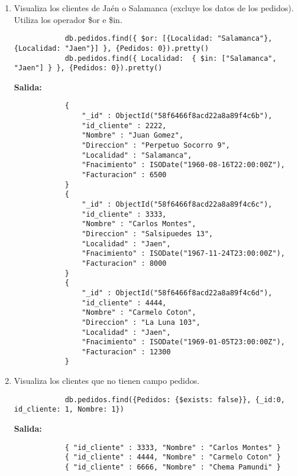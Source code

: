 \begin{enumerate}
	\item  Visualiza los clientes de Jaén o Salamanca (excluye los datos de los pedidos). Utiliza los operador \$or e \$in.
		\begin{lstlisting}
			db.pedidos.find({ $or: [{Localidad: "Salamanca"}, {Localidad: "Jaen"}] }, {Pedidos: 0}).pretty()
			db.pedidos.find({ Localidad:  { $in: ["Salamanca", "Jaen"] } }, {Pedidos: 0}).pretty()
		\end{lstlisting}
		\textbf{Salida:}
		\begin{lstlisting}
			{
				"_id" : ObjectId("58f6466f8acd22a8a89f4c6b"),
				"id_cliente" : 2222,
				"Nombre" : "Juan Gomez",
				"Direccion" : "Perpetuo Socorro 9",
				"Localidad" : "Salamanca",
				"Fnacimiento" : ISODate("1960-08-16T22:00:00Z"),
				"Facturacion" : 6500
			}
			{
				"_id" : ObjectId("58f6466f8acd22a8a89f4c6c"),
				"id_cliente" : 3333,
				"Nombre" : "Carlos Montes",
				"Direccion" : "Salsipuedes 13",
				"Localidad" : "Jaen",
				"Fnacimiento" : ISODate("1967-11-24T23:00:00Z"),
				"Facturacion" : 8000
			}
			{
				"_id" : ObjectId("58f6466f8acd22a8a89f4c6d"),
				"id_cliente" : 4444,
				"Nombre" : "Carmelo Coton",
				"Direccion" : "La Luna 103",
				"Localidad" : "Jaen",
				"Fnacimiento" : ISODate("1969-01-05T23:00:00Z"),
				"Facturacion" : 12300
			}
		\end{lstlisting}

	\item Visualiza los clientes que no tienen campo pedidos.
		\begin{lstlisting}
			db.pedidos.find({Pedidos: {$exists: false}}, {_id:0, id_cliente: 1, Nombre: 1})
		\end{lstlisting}
		\textbf{Salida:}
		\begin{lstlisting}
			{ "id_cliente" : 3333, "Nombre" : "Carlos Montes" }
			{ "id_cliente" : 4444, "Nombre" : "Carmelo Coton" }
			{ "id_cliente" : 6666, "Nombre" : "Chema Pamundi" }
		\end{lstlisting}


\end{enumerate}

